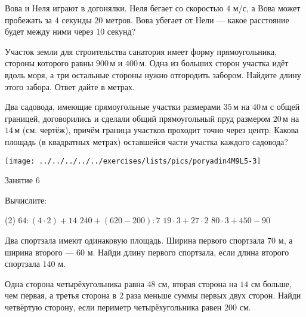 \begin{class}[number=5]
\begin{listofex}
		\item Вова и Неля играют в догонялки. Неля бегает со скоростью \( 4 \) м/с, а Вова может пробежать за \( 4 \) секунды \( 20 \) метров. Вова убегает от Нели --- какое расстояние будет между ними через \( 10 \) секунд?
		\item Участок земли для строительства санатория имеет форму прямоугольника, стороны которого равны \( 900 \) м и \( 400 \) м. Одна из больших сторон участка идёт вдоль моря, а три остальные стороны нужно отгородить забором. Найдите длину этого забора. Ответ дайте в метрах.
		\item 
		\begin{minipage}[t]{\bodywidth}
			Два садовода, имеющие прямоугольные участки размерами \( 35 \) м на \( 40 \) м с общей границей, договорились и сделали общий прямоугольный пруд размером \( 20 \) м на \( 14 \) м (см. чертёж), причём граница участков проходит точно через центр. Какова площадь (в квадратных метрах) оставшейся части участка каждого садовода?
		\end{minipage}
		\hspace{0.02\linewidth}
		\begin{minipage}[t]{\picwidth}
			\texttt{[image: ../../../../../exercises/lists/pics/poryadin4M9L5-3]}
		\end{minipage}
	\end{listofex}
\end{class}

\begin{class}[number=6]
	\begin{listofex}
		\item Занятие 6
	\end{listofex}
\end{class}

\begin{homework}[number=3]
	\begin{listofex}
		\item Вычислите:\begin{tasks}(2)
			\task \( 64: (4\cdot2)+14 \)
			\task \( 240+(620-200):7 \)
			\task \( 19\cdot3+27\cdot2\)
			\task \( 80\cdot3+450-90 \)
		\end{tasks}
		\item Два спортзала имеют одинаковую площадь. Ширина первого спортзала  \( 70 \) м, а ширина второго --- \( 60 \) м. Найди длину первого спортзала, если длина второго спортзала \( 140 \) м.
		\item Одна сторона четырёхугольника равна \( 48 \) см, вторая сторона на \( 14 \) см больше, чем первая, а третья сторона в \( 2 \) раза меньше суммы первых двух сторон. Найди четвёртую сторону, если периметр четырёхугольника равен \( 200 \) см.
	\end{listofex}
\end{homework}


